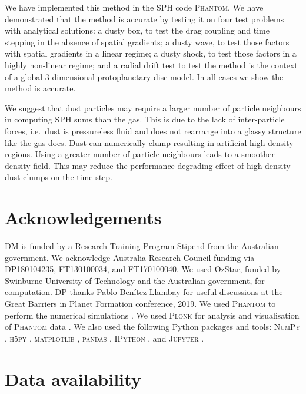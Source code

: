\documentclass[fleqn,usenatbib]{mnras}
\begin{document}
We have implemented this method in the SPH code \textsc{Phantom}. We have
demonstrated that the method is accurate by testing it on four test problems
with analytical solutions: a dusty box, to test the drag coupling and time
stepping in the absence of spatial gradients; a dusty wave, to test those
factors with spatial gradients in a linear regime; a dusty shock, to test those
factors in a highly non-linear regime; and a radial drift test to test the
method is the context of a global 3-dimensional protoplanetary disc model. In
all cases we show the method is accurate.

We suggest that dust particles may require a larger number of particle
neighbours in computing SPH sums than the gas. This is due to the lack of
inter-particle forces, i.e.\ dust is pressureless fluid and does not rearrange
into a glassy structure like the gas does. Dust can numerically clump resulting
in artificial high density regions. Using a greater number of particle
neighbours leads to a smoother density field. This may reduce the performance
degrading effect of high density dust clumps on the time step.


\section*{Acknowledgements}

DM is funded by a Research Training Program Stipend from the Australian
government. We acknowledge Australia Research Council funding via DP180104235,
FT130100034, and FT170100040. We used OzStar, funded by Swinburne University of
Technology and the Australian government, for computation. DP thanks Pablo
Benítez-Llambay for useful discussions at the Great Barriers in Planet Formation
conference, 2019. We used \textsc{Phantom} to perform the numerical simulations
\citep{Price2018PASA...35...31P}. We used \textsc{Plonk} for analysis and
visualisation of \textsc{Phantom} data \citep{Mentiplay2019JOSS....4.1884M}. We
also used the following Python packages and tools: \textsc{NumPy}
\citep{Oliphant2006, van-der-Walt2011CSE....13b..22V}, \textsc{h5py}
\citep{Collette2013}, \textsc{matplotlib} \citep{Hunter2007CSE.....9...90H},
\textsc{pandas} \citep{McKinney2010}, \textsc{IPython}
\citep{Perez2007CSE.....9c..21P}, and \textsc{Jupyter} \citep{Kluyver2016}.


\section*{Data availability}
\end{document}
